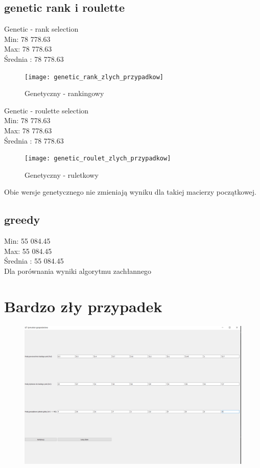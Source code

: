 \documentclass{article}
\begin{document}
\subsection{genetic rank i roulette}

Genetic - rank selection\\
Min: 78 778.63\\
Max: 78 778.63\\
Średnia : 78 778.63\\

\begin{figure}[H]
	\centering
	\texttt{[image: genetic\_rank\_zlych\_przypadkow]}
	\caption{Genetyczny - rankingowy}
	\label{fig:geneticrankzlychprzypadkow}
\end{figure}


Genetic - roulette selection\\
Min: 78 778.63\\
Max: 78 778.63\\
Średnia : 78 778.63\\

\begin{figure}[H]
	\centering
	\texttt{[image: genetic\_roulet\_zlych\_przypadkow]}
	\caption{Genetyczny - ruletkowy}
	\label{fig:geneticrouletzlychprzypadkow}
\end{figure}

Obie wersje genetycznego nie zmieniają wyniku dla takiej macierzy początkowej.


\subsection{greedy}

Min: 55 084.45\\
Max: 55 084.45\\
Średnia : 55 084.45\\

Dla porównania wyniki algorytmu zachłannego

\section{Bardzo zły przypadek}

\begin{figure}[H]
	\centering
	\includegraphics[width=0.7\linewidth]{screens/bad_very_bad_matrix}
	\caption{}
	\label{fig:badverybadmatrix}
\end{figure}
\end{document}
